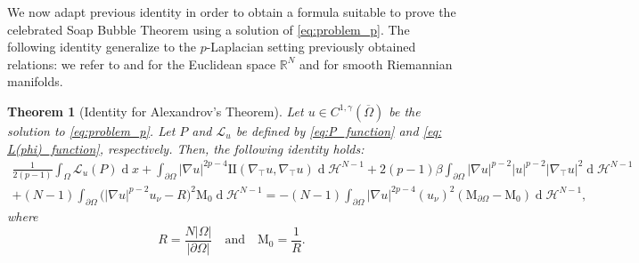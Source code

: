 \documentclass[10pt,a4paper, reqno]{amsart}
\numberwithin{equation}{section}
\newcommand{\R}{\mathbb{R}}
\newtheorem{teo}{Theorem}[section]
\renewcommand{\d}[1]{\ensuremath{\operatorname{d}\!{#1}}}
\begin{document}
We now adapt previous identity in order to obtain a formula suitable to prove the celebrated Soap Bubble Theorem using a solution of \eqref{eq:problem_p}. The following identity generalize to the $p$-Laplacian setting previously obtained relations: we refer to \cite[Thm. 4]{gamo26} and \cite[Thm. 2.2]{mapo19} for the Euclidean space $\R^N$ and \cite{RuHuCh24} for smooth Riemannian manifolds.

\begin{teo}[Identity for Alexandrov's Theorem] \label{teo: identity soap}
Let $u \in C^{1,\gamma}(\overline{\Omega})$ be the solution to \eqref{eq:problem_p}. Let $P$ and $\mathcal{L}_u$ be defined by \eqref{eq:P_function} and \eqref{eq: L(phi)_function}, respectively. Then, the following identity holds:
\begin{equation*}
    \begin{aligned}
    \frac{1}{2(p-1)}\int_\Omega \mathcal{L}_u(P) \d{x} 
    +\int_{\partial\Omega} |\nabla u|^{2p-4} \mathrm{I\!I}(\nabla_\top u,\nabla_\top u) \d{}\mathcal{H}^{N-1}
    + 2(p-1)\beta \int_{\partial\Omega} |\nabla u|^{p-2}|u|^{p-2}|\nabla_\top u|^2 \d{}\mathcal{H}^{N-1} 
    \\
    + (N-1) \int_{\partial\Omega} \Big(|\nabla u|^{p-2} u_\nu - R \Big)^2  \mathrm{M}_{0} \d{}\mathcal{H}^{N-1} 
    =
    - (N-1) \int_{\partial\Omega} |\nabla u|^{2p-4} (u_\nu)^2 (\mathrm{M}_{\partial\Omega} - \mathrm{M}_{0} ) \d{}\mathcal{H}^{N-1},  
    \end{aligned}
\end{equation*}
where
\begin{equation*}
    R = \frac{N|\Omega|}{|\partial\Omega|} \quad\text{and} \quad \mathrm{M}_0 = \frac{1}{R}. 
\end{equation*}
\end{teo}
\end{document}
